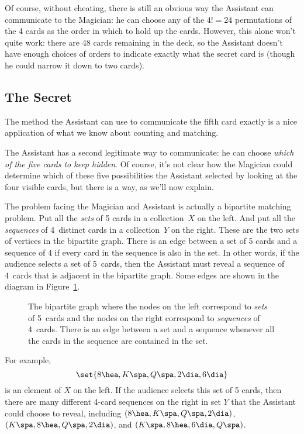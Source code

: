 Of course, without cheating, there is still an obvious way the Assistant
can communicate to the Magician: he can choose any of the $4! = 24$
permutations of the 4 cards as the order in which to hold up the cards.
However, this alone won't quite work: there are 48 cards remaining in the
deck, so the Assistant doesn't have enough choices of orders to indicate
exactly what the secret card is (though he could narrow it down to two
cards).

\subsection{The Secret}

The method the Assistant can use to communicate the fifth card exactly is
a nice application of what we know about counting and matching.

The Assistant has a second legitimate way to communicate: he can
choose \emph{which of the five cards to keep hidden}.  Of course, it's
not clear how the Magician could determine which of these five
possibilities the Assistant selected by looking at the four visible
cards, but there is a way, as we'll now explain.

The problem facing the Magician and Assistant is actually a bipartite
matching problem.  Put all the \emph{sets} of 5 cards in a
collection~$X$ on the left.  And put all the \emph{sequences} of
4~distinct cards in a collection~$Y$ on the right.  These are the two
sets of vertices in the bipartite graph.  There is an edge between a
set of 5 cards and a sequence of 4 if every card in the sequence is
also in the set.  In other words, if the audience selects a set of
5~cards, then the Assistant must reveal a sequence of 4~cards that is
adjacent in the bipartite graph.  Some edges are shown in the diagram
in Figure~\ref{fig:11Q9}.

\begin{figure}


\caption{The bipartite graph where the nodes on the left correspond to
  \emph{sets} of 5~cards and the nodes on the right correspond to
  \emph{sequences} of 4~cards. There is an edge between a set and a
  sequence whenever all the cards in the sequence are contained in the
  set.}

\label{fig:11Q9}

\end{figure}

For example,
\begin{equation}\label{2dia6dia}
\set{ 8 \hea, K \spa, Q \spa, 2 \dia, 6 \dia }
\end{equation}
is an element of $X$ on the left.  If the audience selects this set of 5
cards, then there are many different 4-card sequences on the right in set
$Y$ that the Assistant could choose to reveal, including $(8 \hea, K \spa,
Q \spa, 2 \dia)$, $(K \spa, 8 \hea, Q \spa, 2 \dia)$, and $(K \spa, 8
\hea, 6 \dia, Q \spa)$.

